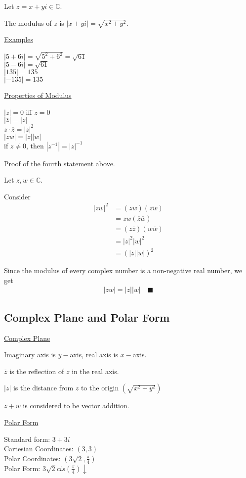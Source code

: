 \documentclass{article}
\begin{document}
Let $z = x + yi \in \mathbb{C}$. 

The modulus of $z$ is $|x + yi| = \sqrt{x^2 + y^2}$. 

\underline{Examples}

$|5 + 6i| = \sqrt{5^2 + 6^2} = \sqrt{61}$\\
$|5-6i| = \sqrt{61}$\\
$|135|=135$\\
$|-135|=135$

\underline{Properties of Modulus}

$|z| = 0$ iff $z = 0$\\
$|\overline{z}| = |z|$\\
$z \cdot \overline{z} = |z|^2$\\
$|zw| = |z||w|$\\
if $z \ne 0$, then $|z^{-1}| = |z|^{-1}$

Proof of the fourth statement above.

Let $z,w \in \mathbb{C}$. 

Consider 
\begin{align*}
    |zw|^2 &= (zw)(\overline{zw})\\
    &= zw(\overline{z}\overline{w})\\
    &= (z\overline{z})(w\overline{w})\\
    &= |z|^2|w|^2\\
    &= (|z||w|)^2
\end{align*}

Since the modulus of every complex number is a non-negative real number, we get 
\begin{align*}
    |zw| = |z||w| \quad \blacksquare
\end{align*}

\subsection{Complex Plane and Polar Form}

\underline{Complex Plane}

Imaginary axis is $y-$axis, real axis is $x-$axis.

$\overline{z}$ is the reflection of $z$ in the real axis. 

$|z|$ is the distance from $z$ to the origin $(\sqrt{x^2+y^2})$

$z + w$ is considered to be vector addition. 

\underline{Polar Form}

Standard form: $3 + 3i$\\
Cartesian Coordinates: $(3,3)$\\
Polar Coordinates: $(3\sqrt{2},\frac{\pi}{4})$\\
Polar Form: $3\sqrt{2}cis(\frac{\pi}{4}) \downarrow$
\end{document}
